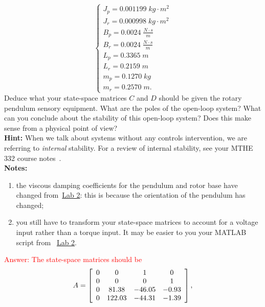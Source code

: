 \documentclass[12pt]{report}
\newcommand\drew[1]{\textcolor{red}{#1}}
\begin{document}
\begin{enumerate}
\[\begin{cases}
                  J_p = 0.001199 \; kg \cdot m^2     \\
                  J_r = 0.000998 \; kg \cdot m^2     \\
                  B_p = 0.0024 \; \frac{N\cdot s}{m} \\
                  B_r = 0.0024 \; \frac{N\cdot s}{m} \\
                  L_p = 0.3365 \; m                  \\
                  L_r = 0.2159 \; m                  \\
                  m_p = 0.1270 \; kg                 \\
                  m_r = 0.2570 \; m.
              \end{cases}
          \]
          Deduce what your state-space matrices $C$ and $D$ should be given the rotary pendulum sensory equipment. What are the poles of the open-loop system? What can you conclude about the stability of this open-loop system? Does this make sense from a physical point of view?\\
          \textbf{Hint:} When we talk about systems without any controls intervention, we are referring to \emph{internal} stability. For a review of internal stability, see your MTHE 332 course notes~\cite[p. 162]{AL:04}.\\
          \textbf{Notes:} \begin{enumerate}
              \item the viscous damping coefficients for the pendulum and rotor base have changed from~\hyperref[lab2:linearization_validity]{Lab 2}: this is because the orientation of the pendulum has changed;
              \item you still have to transform your state-space matrices to account for a voltage input rather than a torque input. It may be easier to you your MATLAB script from ~\hyperref[lab2:linearization_validity]{Lab 2}.
          \end{enumerate}
          \drew{Answer: The state-space matrices should be
              \[
                  A =
                  \left[\begin{array}{c c c c}
                          0 & 0      & 1      & 0     \\
                          0 & 0      & 0      & 1     \\
                          0 & 81.38  & -46.05 & -0.93 \\
                          0 & 122.03 & -44.31 & -1.39
                      \end{array}\right],
\]}
\end{enumerate}
\end{document}
